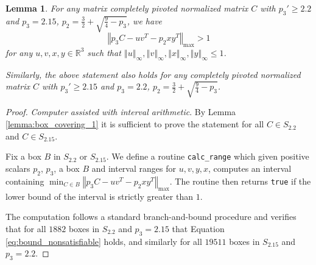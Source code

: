 \documentclass[reqno]{amsart}
\numberwithin{equation}{section}
\newcommand\R{\mathbb{R}}
\newcommand{\norm}[1]{\left\Vert #1 \right\Vert}
\newtheorem{lemma}[theorem]{Lemma}
\begin{document}
\begin{lemma}
\label{lemma:nonsatisfiable_2}
    For any matrix completely pivoted normalized matrix $C$ with $p_3' \geq 2.2$ and $p_3 = 2.15$, $p_2 = \frac 32 + \sqrt{\frac 94 - p_3}$, we have
    \begin{equation}
    \label{eq:bound_nonsatisfiable}
        \norm{p_3 C - uv^T - p_2 xy^T}_{\max} > 1
    \end{equation}
    for any $u,v,x,y \in \R^3$ such that $\norm{u}_\infty, \norm{v}_\infty, \norm{x}_\infty, \norm{y}_\infty \leq 1$.

    Similarly, the above statement also holds for any completely pivoted normalized matrix $C$ with $p_3' \geq 2.15$ and $p_3 = 2.2$, $p_2 = \frac 32 + \sqrt{\frac 94 - p_3}$.
\end{lemma}
\begin{proof}
    \textit{Computer assisted with interval arithmetic}. By Lemma \ref{lemma:box_covering_1}  it is sufficient to prove the statement for all $C \in S_{2.2}$ and $C \in S_{2.15}$.
    
    Fix a box $B$ in $S_{2.2}$ or $S_{2.15}$. We define a routine \texttt{calc\_range} which given positive scalars $p_2$, $p_3$, a box $B$ and interval ranges for $u,v,y,x$, computes an interval containing $\min_{C \in B} \norm{p_3 C - uv^T - p_2 xy^T}_{\max}$.
    The routine then returns \texttt{true} if the lower bound of the interval is strictly greater than $1$.
    
    The computation follows a standard branch-and-bound procedure and verifies that for all $1882$ boxes in $S_{2.2}$ and $p_3 = 2.15$ that Equation \eqref{eq:bound_nonsatisfiable} holds, and similarly for all $19511$ boxes in $S_{2.15}$ and $p_3 = 2.2$.
\end{proof}
\end{document}
